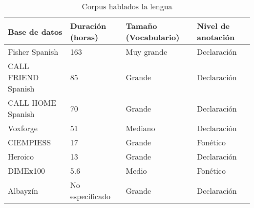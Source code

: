 \begin{table}[H]
\centering
\caption{Corpus hablados la lengua}
\label{tab:spanish_corpora}
\begin{tabular}{|m{35mm}|l|l|l|}
\toprule
\textbf{Base de datos} & \textbf{Duración (horas)} & \textbf{Tamaño (Vocabulario)} & \textbf{Nivel de anotación}\\
\hline
Fisher Spanish \cite{FischerSpa}  & 163 & Muy grande & Declaración\\
\hline
CALL FRIEND Spanish \cite{CALLFRIENDSpa}  & 85 & Grande & Declaración\\
\hline
CALL HOME Spanish \cite{CALLHOMESpa}  & 70 & Grande & Declaración\\
\hline
Voxforge \cite{Voxforge.org}  & 51 & Mediano & Declaración\\
\hline
CIEMPIESS\cite{Hernandez-MenaCIEMPIESS:Corpus}  & 17 & Grande & Fonético\\
\hline
Heroico \cite{HeroicoCorpus}  & 13 & Grande & Declaración  \\
\hline
DIMEx100\cite{Pineda2004DIMEx100:Spanish}  & 5.6 & Medio & Fonético\\
\hline
Albayzín\cite{CampilloAlbayzinEvaluation}  & No especificado  & Grande & Declaración\\
\hline
\end{tabular}
\end{table}